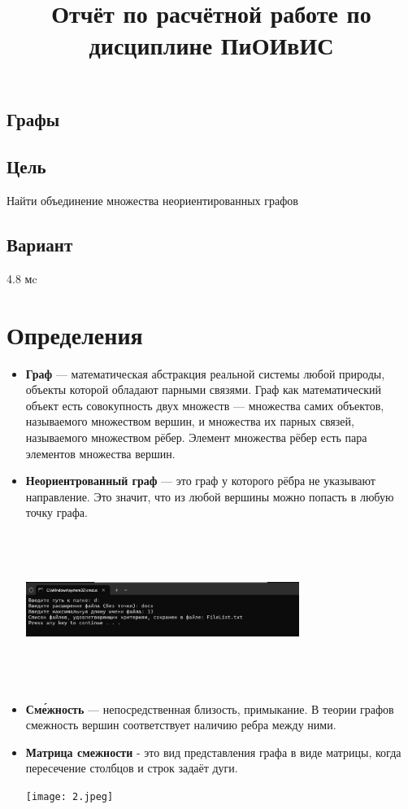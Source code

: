 \documentclass[12pt]{article}
\title{Отчёт по расчётной работе по дисциплине ПиОИвИС}
\author{}
\date{}
\begin{document}
\maketitle

\begin{center}
\section*{Графы}
\end{center}

\subsection*{Цель}
Найти объединение множества неориентированных графов

\subsection*{Вариант}
4.8 мc

\section*{Определения}

\begin{itemize}
    \item \textbf{Граф} —  математическая абстракция реальной системы любой природы, объекты которой обладают парными связями. Граф как математический объект есть совокупность двух множеств — множества самих объектов, называемого множеством вершин, и множества их парных связей, называемого множеством рёбер. Элемент множества рёбер есть пара элементов множества вершин.
    
    
    \item \textbf{Неориентрованный граф} — это граф у которого рёбра не указывают направление. Это значит, что из любой вершины можно попасть в любую точку графа.
    
    
     \includegraphics[width=0.7\textwidth, height=5cm, keepaspectratio]{1.png}
     
    \item \textbf{Сме́жность} — непосредственная близость, примыкание. В теории графов смежность вершин соответствует наличию ребра между ними.
    
    \item \textbf{Матрица смежности} - это вид представления графа в виде матрицы, когда пересечение столбцов и строк задаёт дуги.
    
        \texttt{[image: 2.jpeg]}
        
\end{itemize}
\end{document}
